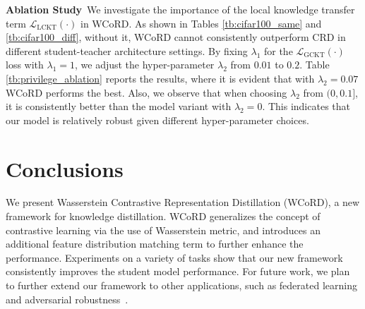 \documentclass[final]{cvpr}
\newcommand{\Lcal}{\mathcal{L}}
\theoremstyle{definition}
\begin{document}
\vspace{5pt}
\noindent\textbf{Ablation Study}\,
We investigate the importance of the local knowledge transfer term  $\Lcal_{\text{LCKT}}(\cdot)$ in WCoRD. As shown in Tables \ref{tb:cifar100_same} and \ref{tb:cifar100_diff}, without it, WCoRD cannot consistently outperform CRD in different student-teacher architecture settings. 
By fixing $\lambda_1$ for the $\Lcal_{\text{GCKT}}(\cdot)$ loss with $\lambda_1=1$, we adjust the hyper-parameter $\lambda_2$ from $0.01$ to $0.2$. Table \ref{tb:privilege_ablation} reports the results, where it is evident that with $\lambda_2=0.07$ WCoRD performs the best. 
Also, we observe that when choosing $\lambda_2$ from $(0,0.1]$, it is consistently better than the model variant with $\lambda_2=0$. This indicates that our model is relatively robust given different hyper-parameter choices.

\section{Conclusions}

We present Wasserstein Contrastive Representation Distillation (WCoRD), a new framework for knowledge distillation.
WCoRD generalizes the concept of contrastive learning via the use of Wasserstein metric, and introduces an additional feature distribution matching term to further enhance the performance.
Experiments on a variety of tasks 
show that our new framework consistently improves the student model performance.
For future work, we plan to further extend our framework to other applications, such as federated learning \cite{konevcny2016federated} and adversarial robustness~\cite{papernot2016distillation}.


\newpage
{\small
    
    
}
\end{document}
